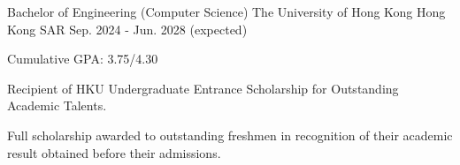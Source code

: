 

\begin{cventries}

  \cventry
    {Bachelor of Engineering (Computer Science)} %
    {The University of Hong Kong} %
    {Hong Kong SAR} %
    {Sep. 2024 - Jun. 2028 (expected)} %
    {
      \begin{cvitems} %
        \item {Cumulative GPA: 3.75/4.30}
        \item {Recipient of HKU Undergraduate Entrance Scholarship for Outstanding Academic Talents.}
        \item {Full scholarship awarded to outstanding freshmen in recognition of their academic result obtained before their
admissions.}
      \end{cvitems}
    }

\end{cventries}
